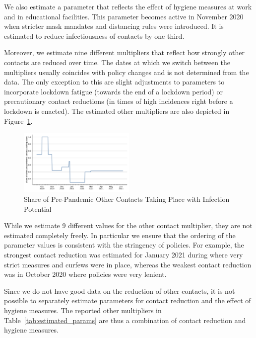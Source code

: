 We also estimate a parameter that reflects the effect of hygiene measures
at work and in educational facilities. This parameter becomes active in November 2020
when stricter mask mandates and distancing rules were introduced. It is estimated to
reduce infectiousness of contacts by one third.

Moreover, we estimate nine different multipliers that reflect how strongly other
contacts are reduced over time. The dates at which we switch between the multipliers
usually coincides with policy changes and is not determined from the data. The only
exception to this are slight adjustments to parameters to incorporate lockdown fatigue
(towards the end of a lockdown period) or precautionary contact reductions (in times
of high incidences right before a lockdown is enacted). The estimated other multipliers
are also depicted in Figure~\ref{fig:other_multiplier}.

\begin{figure}
    \centering
    \includegraphics[width=0.5\textwidth]{figures/results/figures/data/other_multiplier}
    \caption{Share of Pre-Pandemic Other Contacts Taking Place with Infection Potential}
    \label{fig:other_multiplier}
\end{figure}

While we estimate 9 different values for the other contact multiplier, they are not
estimated completely freely. In particular we ensure that the ordering of the parameter
values is consistent with the stringency of policies. For example, the strongest
contact reduction was estimated for January 2021 during where very strict measures
and curfews were in place, whereas the weakest contact reduction was in October 2020
where policies were very lenient.

Since we do not have good data on the reduction of other contacts, it is not possible
to separately estimate parameters for contact reduction and the effect of hygiene
measures. The reported other multipliers in Table~\ref{tab:estimated_params} are thus
a combination of contact reduction and hygiene measures.

